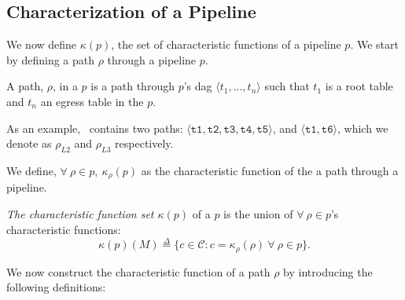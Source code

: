 



\subsection{Characterization of a Pipeline}
We now define $\kappa(p)$, the set of characteristic functions of a pipeline $p$. We start by defining a path $\rho$ through a pipeline $p$.


\begin{definition}
A path, $\rho$, in a $p$ is a path through $p$'s dag $\langle t_1, ..., t_n \rangle$ such that $t_1$ is a root table and $t_n$ an egress table in the $p$.
\end{definition}

As an example, \exampledp\ contains two paths: $\langle \texttt{t1}, \texttt{t2}, \texttt{t3}, \texttt{t4}, \texttt{t5} \rangle$, and $\langle \texttt{t1}, \texttt{t6} \rangle$, which we denote as $\rho_{L2}$ and $\rho_{L3}$ respectively. 

We define, $\forall\ \rho \in p,\ \kappa_\rho(p)$ as the characteristic function of the a path through a pipeline. 

\begin{definition} {\em The characteristic function set $\kappa(p)$} of a $p$ is the union of $\forall\ \rho \in p$'s characteristic functions:
\begin{equation*}
\kappa(p)(M) \overset{\Delta}{=} \{c \in \mathcal{C} : c = \kappa_\rho(\rho)\ \forall\ \rho \in p\}.
\end{equation*}
\end{definition}

We now construct the characteristic function of a path $\rho$ by introducing the following definitions:

